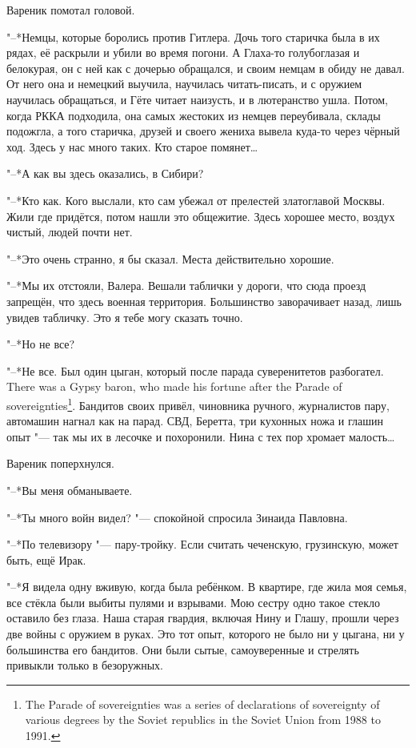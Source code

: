 Вареник помотал головой.

"--*Немцы, которые боролись против Гитлера.
Дочь того старичка была в их рядах, её раскрыли и убили во время погони.
А Глаха-то голубоглазая и белокурая, он с ней как с дочерью обращался, и своим немцам в обиду не давал.
От него она и немецкий выучила, научилась читать-писать, и с оружием научилась обращаться, и Гёте читает наизусть, и в лютеранство ушла.
Потом, когда РККА подходила, она самых жестоких из немцев переубивала, склады подожгла, а того старичка, друзей и своего жениха вывела куда-то через чёрный ход.
Здесь у нас много таких.
Кто старое помянет\ldots{}

"--*А как вы здесь оказались, в Сибири?

"--*Кто как.
Кого выслали, кто сам убежал от прелестей златоглавой Москвы.
Жили где придётся, потом нашли это общежитие.
Здесь хорошее место, воздух чистый, людей почти нет.

"--*Это очень странно, я бы сказал.
Места действительно хорошие.

"--*Мы их отстояли, Валера.
Вешали таблички у дороги, что сюда проезд запрещён, что здесь военная территория.
Большинство заворачивает назад, лишь увидев табличку.
Это я тебе могу сказать точно.

"--*Но не все?

"--*Не все.
{Был один цыган, который после парада суверенитетов разбогател.}
{There was a Gypsy baron, who made his fortune after the Parade of sovereignties\footnote{The Parade of sovereignties was a series of declarations of sovereignty of various degrees by the Soviet republics in the Soviet Union from 1988 to 1991.}.}
Бандитов своих привёл, чиновника ручного, журналистов пару, автомашин нагнал как на парад.
СВД, Беретта, три кухонных ножа и глашин опыт "--- так мы их в лесочке и похоронили.
Нина с тех пор хромает малость\ldots{}

Вареник поперхнулся.

"--*Вы меня обманываете.

"--*Ты много войн видел? "--- спокойной спросила Зинаида Павловна.

"--*По телевизору "--- пару-тройку.
Если считать чеченскую, грузинскую, может быть, ещё Ирак.

"--*Я видела одну вживую, когда была ребёнком.
В квартире, где жила моя семья, все стёкла были выбиты пулями и взрывами.
Мою сестру одно такое стекло оставило без глаза.
Наша старая гвардия, включая Нину и Глашу, прошли через две войны с оружием в руках.
Это тот опыт, которого не было ни у цыгана, ни у большинства его бандитов.
Они были сытые, самоуверенные и стрелять привыкли только в безоружных.

